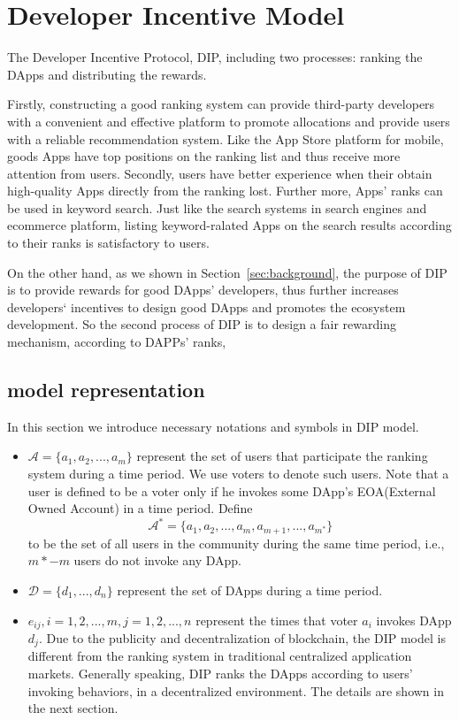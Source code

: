 \section{Developer Incentive Model}
The Developer Incentive Protocol, DIP, including two processes: ranking the DApps and distributing the rewards. 

Firstly, constructing a good ranking system can provide third-party developers with a convenient and effective  platform to promote allocations and provide users with a reliable recommendation system. Like the App Store platform for mobile, goods Apps have top positions on the ranking list and thus receive more attention from users. Secondly, users have better experience when their obtain high-quality Apps directly from the ranking lost. Further more, Apps' ranks can be used in keyword search. Just like the search systems in search engines and ecommerce platform,  listing keyword-ralated Apps on the search results according to their ranks is satisfactory to users. 

On the other hand, as we shown in Section~\ref{sec:background}, the purpose of DIP is to provide rewards for good DApps' developers, thus further increases developers‘ incentives to design good DApps and promotes the ecosystem development. So the second process of DIP is to design a fair rewarding mechanism, according to DAPPs' ranks, 

\subsection{model representation}
\label{subsection:parameters}
In this section we introduce necessary notations and symbols in DIP model.

\begin{itemize}
	\item $\mathcal{A}=\{a_1,a_2,...,a_m\}$ represent the set of users that participate the ranking system during a time period. We use voters to denote such users. Note that a user is defined to be a voter only if he invokes some DApp's EOA(External Owned Account) in a time period. Define $$\mathcal{A}^*=\{a_1,a_2,...,a_m,a_{m+1},...,a_{m^*}\}$$
	to be the set of all users in the community during the same time period, i.e., $m*-m$ users do not invoke any DApp. 	
  \item $\mathcal{D}=\{d_1,...,d_n\}$ represent the set of DApps during a time period.
  \item $e_{ij},i=1,2,...,m, j=1,2,...,n$ represent the times that voter $a_i$ invokes DApp $d_j$. Due to the publicity and decentralization of blockchain, the DIP model is different from the ranking system in traditional centralized application markets. Generally speaking, DIP ranks the DApps according to users' invoking behaviors, in a decentralized environment. The details are shown in the next section.
\end{itemize}


